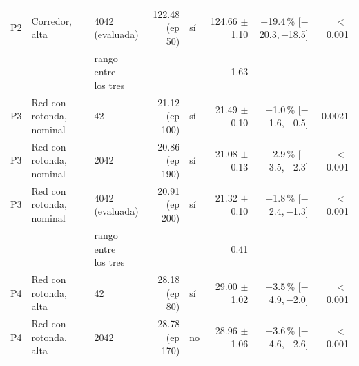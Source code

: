 \begin{table}[H]
\begin{tabular}{lllrlrrr}
P2 & \makecell[l]{Corredor,\\{}alta} & \makecell[l]{4042\\{}(evaluada)} & \makecell[r]{122.48\\{}(ep 50)} & sí & \makecell[r]{124.66\\{}$\pm$ 1.10} & \makecell[r]{$-$19.4\,\%\\{}[$-$20.3,\,$-$18.5]} & $<$\,0.001 \\
 & & \makecell[l]{rango entre\\{}los tres} & & & 1.63 & & \\
P3 & \makecell[l]{Red con rotonda,\\{}nominal} & 42 & \makecell[r]{21.12\\{}(ep 100)} & sí & \makecell[r]{21.49\\{}$\pm$ 0.10} & \makecell[r]{$-$1.0\,\%\\{}[$-$1.6,\,$-$0.5]} & 0.0021 \\
P3 & \makecell[l]{Red con rotonda,\\{}nominal} & 2042 & \makecell[r]{20.86\\{}(ep 190)} & sí & \makecell[r]{21.08\\{}$\pm$ 0.13} & \makecell[r]{$-$2.9\,\%\\{}[$-$3.5,\,$-$2.3]} & $<$\,0.001 \\
P3 & \makecell[l]{Red con rotonda,\\{}nominal} & \makecell[l]{4042\\{}(evaluada)} & \makecell[r]{20.91\\{}(ep 200)} & sí & \makecell[r]{21.32\\{}$\pm$ 0.10} & \makecell[r]{$-$1.8\,\%\\{}[$-$2.4,\,$-$1.3]} & $<$\,0.001 \\
 & & \makecell[l]{rango entre\\{}los tres} & & & 0.41 & & \\
P4 & \makecell[l]{Red con rotonda,\\{}alta} & 42 & \makecell[r]{28.18\\{}(ep 80)} & sí & \makecell[r]{29.00\\{}$\pm$ 1.02} & \makecell[r]{$-$3.5\,\%\\{}[$-$4.9,\,$-$2.0]} & $<$\,0.001 \\
P4 & \makecell[l]{Red con rotonda,\\{}alta} & 2042 & \makecell[r]{28.78\\{}(ep 170)} & no & \makecell[r]{28.96\\{}$\pm$ 1.06} & \makecell[r]{$-$3.6\,\%\\{}[$-$4.6,\,$-$2.6]} & $<$\,0.001 \\

\end{tabular}
\end{table}
